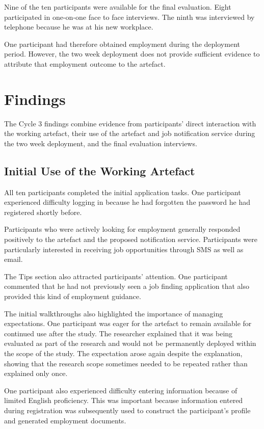 Nine of the ten participants were available for the final evaluation. Eight participated in one-on-one face to face interviews. The ninth was interviewed by telephone because he was at his new workplace.

One participant had therefore obtained employment during the deployment period. However, the two week deployment does not provide sufficient evidence to attribute that employment outcome to the artefact.


\section{Findings}

The Cycle 3 findings combine evidence from participants' direct interaction with the working artefact, their use of the artefact and job notification service during the two week deployment, and the final evaluation interviews.


\subsection{Initial Use of the Working Artefact}

All ten participants completed the initial application tasks. One participant experienced difficulty logging in because he had forgotten the password he had registered shortly before.

Participants who were actively looking for employment generally responded positively to the artefact and the proposed notification service. Participants were particularly interested in receiving job opportunities through SMS as well as email.

The Tips section also attracted participants' attention. One participant commented that he had not previously seen a job finding application that also provided this kind of employment guidance.

The initial walkthroughs also highlighted the importance of managing expectations. One participant was eager for the artefact to remain available for continued use after the study. The researcher explained that it was being evaluated as part of the research and would not be permanently deployed within the scope of the study. The expectation arose again despite the explanation, showing that the research scope sometimes needed to be repeated rather than explained only once.

One participant also experienced difficulty entering information because of limited English proficiency. This was important because information entered during registration was subsequently used to construct the participant's profile and generated employment documents.

